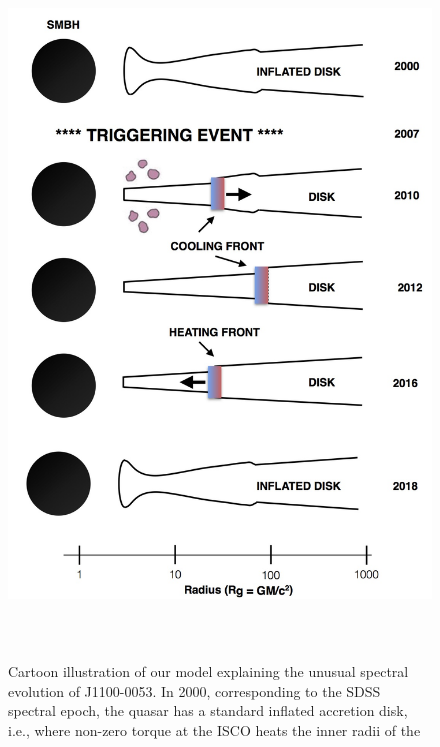 \documentclass{nature}
\begin{document}
\begin{figure}
  \includegraphics[width=15.4cm, height=18.75cm, trim=0.0cm 0.0cm 0.0cm 0.0cm, clip]
  {../plots/models/cartoon_v3pnt1.jpg}
  \centering
  \caption[]{
    Cartoon illustration of our model explaining the unusual spectral
    evolution of J1100-0053. In 2000, corresponding to the SDSS spectral
    epoch, the quasar has a standard inflated accretion disk, i.e.,
    where non-zero torque at the ISCO heats the inner radii of the
}
\end{figure}
\end{document}
